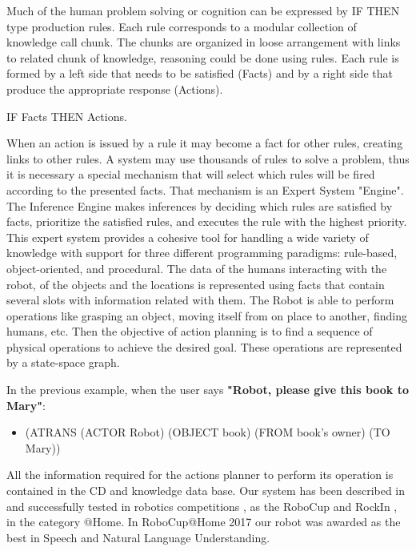 \documentclass{llncs}
\begin{document}
Much of the human problem solving or cognition can be expressed by IF THEN type production rules. Each rule corresponds to a modular collection of knowledge call chunk. The chunks are organized in loose arrangement with links to related chunk of knowledge, reasoning could be done using rules. 
Each rule is formed by a left side that needs to be satisfied (Facts) and by a right side that produce the appropriate response (Actions).  
\vspace{.01 in}

		IF  Facts  THEN  Actions.
\vspace{.01 in}

When an action is issued by a rule it may become a fact for other rules, creating links to other rules. A system may use thousands of rules to solve a problem, thus it is necessary a special mechanism that will select which rules will be fired according to the presented facts. That mechanism is an Expert System "Engine".
The Inference Engine makes inferences by deciding which rules are satisfied by facts, prioritize the 
satisfied rules, and executes the rule with the highest priority.
This expert system provides a cohesive tool for handling a wide variety of knowledge with support for three different programming paradigms: rule-based, object-oriented, and procedural.
The data of the humans interacting with the robot, of the objects and the locations is represented using facts that contain several slots with information related with them.
The Robot is able to perform operations like grasping an object, moving itself from on place to another, finding humans, etc. Then the objective of action planning is to find a sequence of physical operations to achieve the desired goal.
These operations are represented by a state-space graph.

In the previous example, when the user says {\bf "Robot, please give this book to Mary"}: 
\begin{itemize}
\item []
	(ATRANS (ACTOR Robot) (OBJECT book) (FROM book's owner) (TO Mary))
\end{itemize}

All the information required for the actions planner to perform its operation is contained in the CD and knowledge data base. 
Our system has been described in  \cite{iros2017} and successfully tested in robotics competitions \cite{Savage}, as the RoboCup and RockIn 
\cite{Robocup_2017}, in the category @Home.
In RoboCup@Home 2017 our robot was awarded as the best in Speech and Natural Language Understanding.
\end{document}
